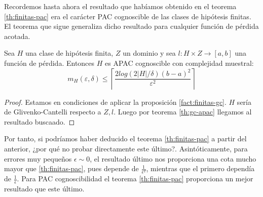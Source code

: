 Recordemos hasta ahora el resultado que habíamos obtenido en el teorema \ref{th:finitas-pac} 
era el carácter PAC cognoscible de las clases de hipótesis finitas. El teorema que sigue generaliza dicho resultado
para cualquier función de pérdida acotada.

\begin{corollary}
Sea $H$ una clase de hipótesis finita, $Z$ un dominio y sea $l : H \times Z \rightarrow [a,b]$ una
función de pérdida. Entonces $H$ es APAC cognoscible con complejidad muestral:
\[
  m_{H}( \varepsilon, \delta ) \le \left\lceil \frac{2 log(2|H|/\delta)(b-a)^2}{\varepsilon^2} \right\rceil
\]

\label{finitas-apac}
\end{corollary}
  
  \begin{proof}
  Estamos en condiciones de aplicar la proposición \ref{fact:finitas-gc}. $H$ sería de Glivenko-Cantelli 
  respecto a $Z,l$. Luego por teorema \ref{th:gc-apac} llegamos al resultado buscaado.
  \end{proof}

Por tanto, si podríamos haber deducido el teorema \ref{th:finitas-pac} a partir del anterior, ¿por qué no probar
directamente este último?. Asintóticamente, para errores muy pequeños $\epsilon \sim 0$, el resultado último nos 
proporciona una cota mucho mayor que \ref{th:finitas-pac}, pues depende de $\frac{1}{\epsilon^2}$, mientras que el primero
dependía de $\frac{1}{\epsilon}$. Para PAC cognoscibilidad el teorema \ref{th:finitas-pac} proporciona un mejor
resultado que este último.
